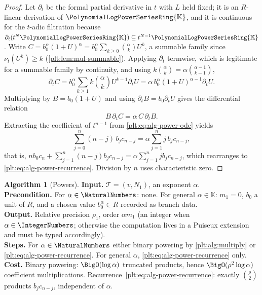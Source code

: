 \documentclass[11pt,oneside]{article}
\theoremstyle{plain}
\theoremstyle{definition}
\newtheorem{algorithm}[theorem]{Algorithm}
\theoremstyle{remark}
\newcommand{\K}{\mathbb{K}}
\newcommand{\PLpow}{\PolynomialLogPowerSeriesRing{\K}}   %
\newcommand{\ordt}{\nu_{t}}                              %
\begin{document}
\begin{proof}
Let \(\partial_t\) be the formal partial derivative in \(t\) with \(L\) held
fixed; it is an \(R\)-linear derivation of \(\PLpow\), and it is continuous for
the \(t\)-adic filtration because \(\partial_t(t^N\PLpow)\subseteq
t^{N-1}\PLpow\).  Write \(C=b_0^{\alpha}(1+U)^{\alpha}
=b_0^{\alpha}\sum_{k\ge0}\binom{\alpha}{k}U^{k}\), a summable family since
\(\ordt(U^k)\ge k\) (\cref{plt:lem:mul-summable}).  Applying \(\partial_t\)
termwise, which is legitimate for a summable family by continuity, and using
\(k\binom{\alpha}{k}=\alpha\binom{\alpha-1}{k-1}\),
\[
 \partial_tC
 =b_0^{\alpha}\sum_{k\ge1}k\binom{\alpha}{k}U^{k-1}\partial_tU
 =\alpha\,b_0^{\alpha}(1+U)^{\alpha-1}\partial_tU .
\]
Multiplying by \(B=b_0(1+U)\) and using \(\partial_tB=b_0\partial_tU\) gives
the differential relation
\begin{equation}\label{plt:eq:alg-power-ode}
 B\,\partial_tC=\alpha\,C\,\partial_tB .
\end{equation}
Extracting the coefficient of \(t^{n-1}\) from
\cref{plt:eq:alg-power-ode} yields
\[
 \sum_{j=0}^{n}(n-j)\,b_jc_{n-j}=\alpha\sum_{j=1}^{n}j\,b_jc_{n-j},
\]
that is, \(n b_0c_n+\sum_{j=1}^{n}(n-j)b_jc_{n-j}
=\alpha\sum_{j=1}^{n}jb_jc_{n-j}\), which rearranges to
\cref{plt:eq:alg-power-recurrence}.  Division by \(n\) uses characteristic
zero.
\end{proof}

\begin{algorithm}[Powers]\label{plt:alg:power}
\textbf{Input.}  \(\mathcal T=(v,N_1)\), an exponent \(\alpha\).\\
\textbf{Precondition.}  For \(\alpha\in\NaturalNumbers\): none.  For general
\(\alpha\in\K\): \(m_1=0\), \(b_0\) a unit of \(R\), and a chosen value
\(b_0^{\alpha}\in R\) recorded as branch data.\\
\textbf{Output.}  Relative precision \(\rho_1\), order \(\alpha m_1\)
(an integer when \(\alpha\in\IntegerNumbers\); otherwise the computation lives
in a Puiseux extension and must be typed accordingly).\\
\textbf{Steps.}  For \(\alpha\in\NaturalNumbers\) either binary powering by
\cref{plt:alg:multiply} or \cref{plt:eq:alg-power-recurrence}.  For general
\(\alpha\), \cref{plt:eq:alg-power-recurrence} only.\\
\textbf{Cost.}  Binary powering: \(\BigO(\log\alpha)\) truncated products,
hence \(\BigO(\rho^2\log\alpha)\) coefficient multiplications.
Recurrence~\cref{plt:eq:alg-power-recurrence}: exactly \(\binom{\rho}{2}\)
products \(b_jc_{n-j}\), independent of \(\alpha\).
\end{algorithm}
\end{document}
